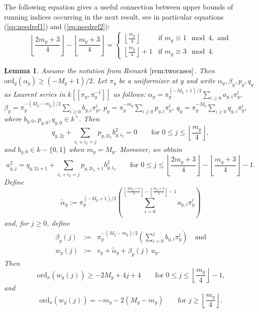 \documentclass{amsart}
\numberwithin{equation}{section}
\numberwithin{table}{section}
\theoremstyle{plain}
\newtheorem{lemma}[theorem]{Lemma}
\theoremstyle{definition}
\theoremstyle{remark}
\begin{document}
The following equation gives a useful connection between upper bounds of running indices occurring in the next result, see in particular equations (\ref{eq:needref1}) and (\ref{eq:needref2}):
\begin{equation}
\label{eq:duh1new}
\left\lfloor \frac{2m_y+3}{4}\right\rfloor - \left\lfloor \frac{m_y+3}{4}\right\rfloor 
= \left\{\begin{array}{ll} \left\lfloor \frac{m_y}{4}\right\rfloor  & \mbox{if } m_y\equiv 1 \mod 4, \mbox{ and}\\
\left\lfloor \frac{m_y}{4}\right\rfloor +1 & \mbox{if } m_y\equiv 3 \mod 4.
\end{array}\right.
\end{equation}


\begin{lemma}
\label{lem:twocases}
Assume the notation from Remark $\ref{rem:twocases}$. Then $\mathrm{ord}_y(\alpha_y)\ge (-M_y+1)/2$. Let $\pi_y$ be a uniformizer at $y$ and write $\alpha_y,\beta_y,p_y,q_y$ as Laurent series in $k[[\pi_y,\pi_y^{-1}]]$ as follows:
$\alpha_y=\pi_y^{(-M_y+1)/2}\sum_{i\ge 0} a_{y,i}\pi_y^i$, $\beta_y=\pi_y^{-(M_y-m_y)/2}\sum_{i\ge 0} b_{y,i}\pi_y^i$,
$p_y=\pi_y^{-m_y}\sum_{i\ge 0} p_{y,i}\pi_y^i$, $q_y=\pi_y^{-M_y}\sum_{i\ge 0} q_{y,i}\pi_y^i$, where $b_{y,0},p_{y,0},q_{y,0}\in k^\times$. Then 
\begin{equation}
\label{eq:needref1}
q_{y,2j} + \sum_{i_1+i_2=j} p_{y,2i_1}b_{y,i_2}^2 = 0 \qquad\mbox{for } 0\le j \le \textstyle{\left\lfloor \frac{m_y}{4}\right\rfloor},
\end{equation} 
and $b_{y,0}\in k-\{0,1\}$ when $m_y=M_y$. Moreover, we obtain
\begin{equation}
\label{eq:needref2}
a_{y,j}^2=q_{y,2j+1} + \sum_{i_1+i_2=j} p_{y,2i_1+1}b_{y,i_2}^2\qquad\mbox{for } 0\le j \le \textstyle{\left\lfloor \frac{2m_y+3}{4}\right\rfloor} - \textstyle{\left\lfloor \frac{m_y+3}{4}\right\rfloor} - 1.
\end{equation}
Define 
\begin{equation}
\label{eq:wuj1}
\widetilde{\alpha}_y:=\pi_y^{(-M_y+1)/2} \left(\sum_{i = 0}^{\left\lfloor \frac{2m_y+3}{4}\right\rfloor - \left\lfloor \frac{m_y+3}{4}\right\rfloor - 1} a_{y,i}\pi_y^i\right)
\end{equation}
and, for $j\ge 0$, define
\begin{eqnarray}
\label{eq:wuj21}
\beta_y(j) &:=& \pi_y^{-(M_y-m_y)/2} \left(\sum_{i=0}^j b_{y,i}\pi_y^i\right) \quad \mbox{and}\\
\label{eq:wuj22}
w_y(j) &:=& v_y + \widetilde{\alpha}_y + \beta_y(j)\,u_y.
\end{eqnarray}
Then
\begin{equation}
\label{eq:useful1}
\mathrm{ord}_x(w_y(j)) \ge -2M_y+4j+4 \qquad\mbox{for $0\le j \le \textstyle{\left\lfloor \frac{m_y}{4}\right\rfloor} -1 $,}
\end{equation}
and 
\begin{equation}
\label{eq:useful2}
\mathrm{ord}_x(w_y(j)) = -m_y-2(M_y-m_y)\qquad\mbox{for $j\ge \textstyle{\left\lfloor \frac{m_y}{4}\right\rfloor}$.}
\end{equation}
\end{lemma}
\end{document}
